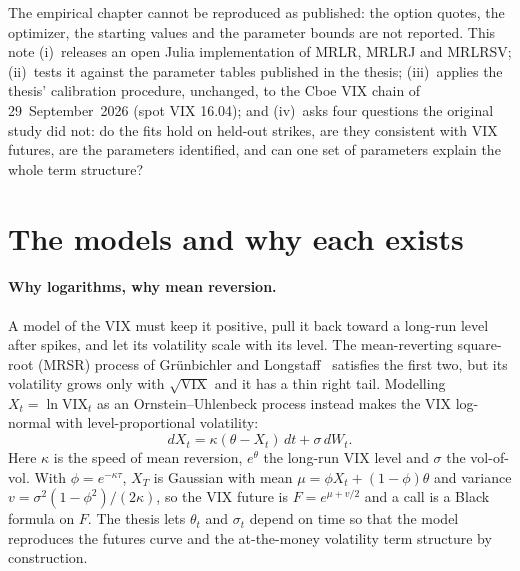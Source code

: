 \documentclass[10pt,twocolumn]{article}
\newcommand{\VIX}{\mathrm{VIX}}
\begin{document}
The empirical chapter cannot be reproduced as published: the option quotes, the
optimizer, the starting values and the parameter bounds are not reported. This note
(i)~releases an open Julia implementation of MRLR, MRLRJ and MRLRSV; (ii)~tests it
against the parameter tables published in the thesis; (iii)~applies the thesis'
calibration procedure, unchanged, to the Cboe VIX chain of 29~September~2026 (spot
VIX 16.04); and (iv)~asks four questions the original study did not: do the fits
hold on held-out strikes, are they consistent with VIX futures, are the parameters
identified, and can one set of parameters explain the whole term structure?

\section{The models and why each exists}
\label{sec:models}

\paragraph{Why logarithms, why mean reversion.}
A model of the VIX must keep it positive, pull it back toward a long-run level after
spikes, and let its volatility scale with its level. The mean-reverting square-root
(MRSR) process of Gr\"unbichler and Longstaff~\citep{grunbichler1996} satisfies the
first two, but its volatility grows only with $\sqrt{\VIX}$ and it has a thin right
tail. Modelling $X_t=\ln\VIX_t$ as an Ornstein--Uhlenbeck process instead makes the
VIX log-normal with level-proportional volatility:
\begin{equation}
dX_t=\kappa(\theta-X_t)\,dt+\sigma\,dW_t.\tag{MRLR}
\end{equation}
Here $\kappa$ is the speed of mean reversion, $e^\theta$ the long-run VIX level and
$\sigma$ the vol-of-vol. With $\phi=e^{-\kappa\tau}$, $X_T$ is Gaussian with mean
$\mu=\phi X_t+(1-\phi)\theta$ and variance $v=\sigma^2(1-\phi^2)/(2\kappa)$, so the
VIX future is $F=e^{\mu+v/2}$ and a call is a Black formula on $F$. The thesis lets
$\theta_t$ and $\sigma_t$ depend on time so that the model reproduces the futures
curve and the at-the-money volatility term structure by construction.
\end{document}
